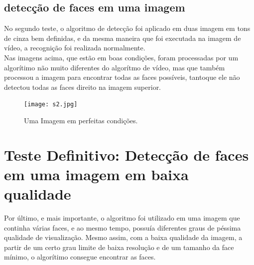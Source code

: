 \documentclass{article}
\begin{document}
	\subsection{detecção de faces em uma imagem}
	No segundo teste, o algoritmo de detecção foi aplicado em duas imagem em tons de cinza bem definidas, e da mesma maneira que foi executada na imagem de vídeo, a recognição foi realizada normalmente.\\
	Nas imagens acima, que estão em boas condições, foram processadas por um algorítimo não muito diferentes do algorítmo de vídeo, mas que também processou a imagem para encontrar todas as faces possíveis, tantoque ele não detectou todas as faces direito na imagem superior.
	\vspace{4mm}
	\begin{figure}
		\centering
		\texttt{[image: s2.jpg]}
		\caption{Uma Imagem em perfeitas condições.}
	\end{figure}
	\vspace{4mm}
	
	\newpage
	\section{Teste Definitivo: Detecção de faces em uma imagem em baixa qualidade}
	Por último, e mais importante, o algoritmo foi utilizado em uma imagem que continha várias faces, e ao mesmo tempo, possuía diferentes graus de péssima qualidade de visualização. Mesmo assim, com a baixa qualidade da imagem, a partir de um certo grau limite de baixa resolução e de um tamanho da face mínimo, o algorítimo consegue encontrar as faces.\\
	
\end{document}

